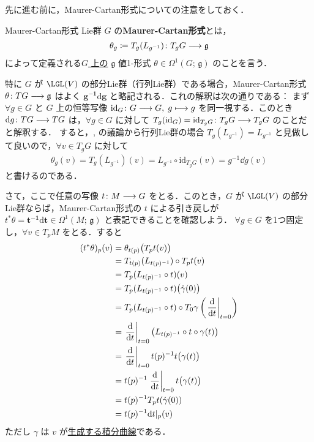 \documentclass[geometry_main]{subfiles}
\begin{document}
先に進む前に，Maurer-Cartan形式についての注意をしておく．

\begin{mydef}[label=def:Maurer-Cartan]{Maurer-Cartan形式}
    Lie群 $G$ の\textbf{Maurer-Cartan形式}とは，
    \begin{align}
        \theta_g \coloneqq T_g(L_{g^{-1}}) \colon T_g G \longrightarrow \mathfrak{g}
    \end{align}
    によって定義される\underline{$G$ 上の} $\mathfrak{g}$ 値1-形式 $\theta \in \Omega^1(G;\, \mathfrak{g})$ のことを言う．
\end{mydef}
特に $G$ が $\LGL (V)$ の部分Lie群（行列Lie群）である場合，Maurer-Cartan形式 $\theta \colon TG \longrightarrow \mathfrak{g}$ はよく $\bm{g^{-1} \mathrm{d} g}$ と略記される．これの解釈は次の通りである：
まず $\forall g \in G$ と $G$ 上の恒等写像 $\mathrm{id}_G \colon G \longrightarrow G,\; g \longmapsto g$ を同一視する．このとき $\dd g \colon TG \longrightarrow TG$ は，$\forall g \in G$ に対して $T_g (\mathrm{id}_G) = \mathrm{id}_{T_g G} \colon T_g G \longrightarrow T_g G$ のことだと解釈する．
すると，, の議論から行列Lie群の場合 $T_g(L_{g^{-1}}) = L_{g^{-1}}$ と見做して良いので，$\forall v \in T_g G$ に対して
\begin{align}
    \theta_g(v) = T_g(L_{g^{-1}})(v) = L_{g^{-1}} \circ \mathrm{id}_{T_g G}(v) = g^{-1} \dd g(v)
\end{align}
と書けるのである．

さて，ここで任意の\cinfty 写像 $t \colon M \longrightarrow G$ をとる．このとき，$G$ が $\LGL (V)$ の部分Lie群ならば，Maurer-Cartan形式の $t$ による引き戻しが $t^* \theta = \bm{t^{-1} \mathrm{d} t} \in \Omega^1(M;\, \mathfrak{g})$ と表記できることを確認しよう．
$\forall g \in G$ を1つ固定し，$\forall v \in T_p M$ をとる．すると
\begin{align}
    (t^* \theta)_p (v)
    &= \theta_{t(p)} \bigl( T_p t (v) \bigr) \\
    &= T_{t(p)} (L_{t(p)^{-1}}) \circ T_p t (v) \\
    &= T_p (L_{t(p)^{-1}} \circ t)(v) \\
    &= T_p (L_{t(p)^{-1}} \circ t)\bigl(\dot{\gamma}(0)\bigr) \\
    &= T_p (L_{t(p)^{-1}} \circ t) \circ T_0 \gamma \left( \eval{\dv{}{t}}_{t=0} \right) \\
    &= \eval{\dv{}{t}}_{t=0} \bigl( L_{t(p)^{-1}} \circ t \circ \gamma(t) \bigr) \\
    &= \eval{\dv{}{t}}_{t=0} t(p)^{-1} t \bigl( \gamma(t) \bigr) \\
    &= t(p)^{-1} \eval{\dv{}{t}}_{t=0} t\bigl( \gamma(t) \bigr) \\
    &= t(p)^{-1} T_p t (\dot{\gamma}(0)) \\
    &= t(p)^{-1} \dd t|_p (v)
\end{align}
ただし $\gamma$ は $v$ が\hyperref[thm:fundamental-flow]{生成する積分曲線}である．
\end{document}
